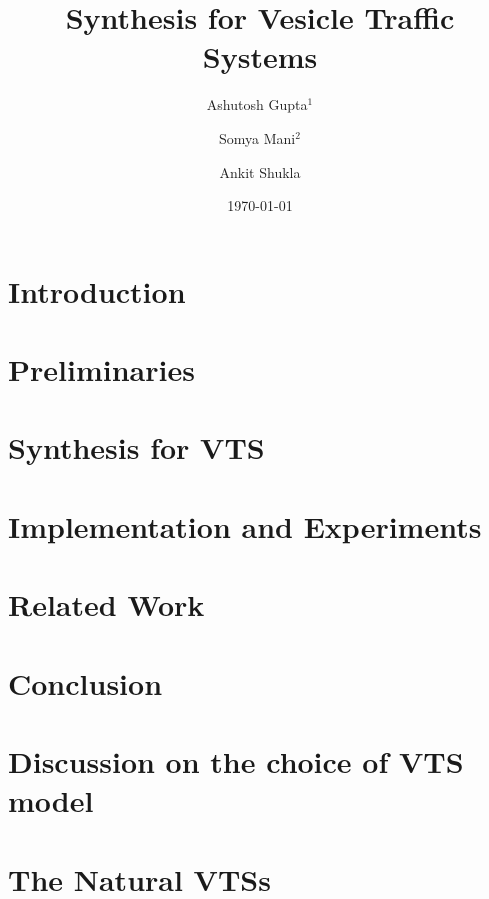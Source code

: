 \documentclass[draft]{llncs}
\begin{document}
\title{Synthesis for Vesicle Traffic Systems}

\author{Ashutosh Gupta$^1$ \and Somya Mani$^2$ \and Ankit Shukla}


\date{\today}

\maketitle

\begin{abstract}

\end{abstract}

\section{Introduction}
\label{sec:intro}


% 

\section{Preliminaries}
\label{sec:prelim}


\section{Synthesis for VTS}
\label{sec:encoding}


\section{Implementation and Experiments}
\label{sec:experiments}


\section{Related Work}
\label{sec:related}


\section{Conclusion}
\label{sec:conclusion}





\appendix
\clearpage

\section{Discussion on the choice of VTS model}
\label{sec:model}


\section{The Natural VTSs}
\label{sec:ex-vts}

\end{document}
